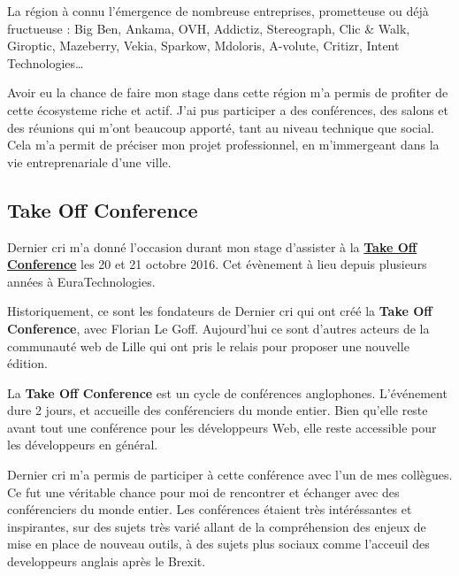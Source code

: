 \documentclass[12pt,a4paper]{article}
\begin{document}
  La région à connu l'émergence de nombreuse entreprises, prometteuse ou
  déjà fructueuse : Big Ben, Ankama, OVH, Addictiz, Stereograph, Clic \&
  Walk, Giroptic, Mazeberry, Vekia, Sparkow, Mdoloris, A-volute, Critizr,
  Intent Technologies\ldots{}

  \bigskip

  Avoir eu la chance de faire mon stage dans cette région m'a permis de
  profiter de cette écosysteme riche et actif. J'ai pus participer a des
  conférences, des salons et des réunions qui m'ont beaucoup apporté, tant
  au niveau technique que social. Cela m'a permit de préciser mon projet
  professionnel, en m'immergeant dans la vie entreprenariale d'une ville.

  \bigskip

  \subsection{Take Off Conference}\label{take-off-conference}

  \bigskip

  Dernier cri m'a donné l'occasion durant mon stage d'assister à la
  \href{http://takeoffconf.com/2016}{\textbf{Take Off Conference}} les 20
  et 21 octobre 2016. Cet évènement à lieu depuis plusieurs années à
  EuraTechnologies.

  \bigskip

  Historiquement, ce sont les fondateurs de Dernier cri qui ont créé la
  \textbf{Take Off Conference}, avec Florian Le Goff. Aujourd'hui ce sont
  d'autres acteurs de la communauté web de Lille qui ont pris le relais
  pour proposer une nouvelle édition.

  \bigskip

  La \textbf{Take Off Conference} est un cycle de conférences anglophones.
  L'événement dure 2 jours, et accueille des conférenciers du monde
  entier. Bien qu'elle reste avant tout une conférence pour les
  développeurs Web, elle reste accessible pour les développeurs en
  général.

  \bigskip

  Dernier cri m'a permis de participer à cette conférence avec l'un de mes
  collègues. Ce fut une véritable chance pour moi de rencontrer et
  échanger avec des conférenciers du monde entier. Les conférences étaient
  très intéréssantes et inspirantes, sur des sujets très varié allant de
  la compréhension des enjeux de mise en place de nouveau outils, à des
  sujets plus sociaux comme l'acceuil des developpeurs anglais après le
  Brexit.
\end{document}
